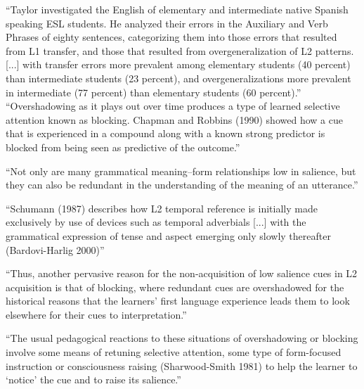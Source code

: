 


``Taylor investigated
the English of elementary and intermediate native Spanish speaking ESL
students. He analyzed their errors in the Auxiliary and Verb Phrases of eighty
sentences, categorizing them into those errors that resulted from L1 transfer,
and those that resulted from overgeneralization of L2 patterns.
[...] with transfer
errors more prevalent among elementary students (40 percent) than
intermediate students (23 percent), and overgeneralizations more prevalent
in intermediate (77 percent) than elementary students (60 percent).''
``Overshadowing as it plays out over time produces a type of learned
selective attention known as blocking. Chapman and Robbins (1990) showed
how a cue that is experienced in a compound along with a known strong
predictor is blocked from being seen as predictive of the outcome.''

``Not only are many grammatical meaning–form relationships low in salience,
but they can also be redundant in the understanding of the meaning of
an utterance.''

``Schumann (1987) describes how L2 temporal reference is initially made exclusively
by use of devices such as temporal adverbials [...] with the grammatical expression of tense and aspect emerging only
slowly thereafter (Bardovi-Harlig 2000)''

``Thus, another pervasive reason for the non-acquisition of low salience cues
in L2 acquisition is that of blocking, where redundant cues are overshadowed
for the historical reasons that the learners’ first language experience leads
them to look elsewhere for their cues to interpretation.''

``The usual pedagogical reactions to these situations of overshadowing or
blocking involve some means of retuning selective attention, some type of
form-focused instruction or consciousness raising (Sharwood-Smith 1981) to
help the learner to ‘notice’ the cue and to raise its salience.''


